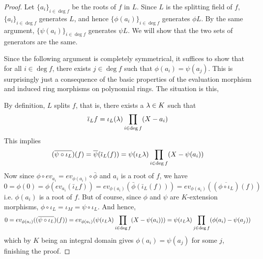 \documentclass[../book.tex]{subfiles}
\begin{document}
\begin{proof}
    Let $\{a_i\}_{i\in\deg f}$ be the roots of $f$ in $L$. 
    Since $L$ is the splitting field of $f$, $\{a_i\}_{i\in\deg f}$ generates $L$,
    and hence $\{\phi(a_i)\}_{i\in\deg f}$ generates $\phi L$. 
    By the same argument, $\{\psi(a_i)\}_{i\in\deg f}$ generates $\psi L$. 
    We will show that the two sets of generators are the same.
    
    Since the following argument is completely symmetrical, it suffices to show
    that for all $i \in \deg f$, there exists $j \in \deg f$ such that
    $\phi(a_i) = \psi(a_j)$.
    This is surprisingly just a consequence
    of the basic properties of the evaluation morphism and 
    induced ring morphisms on polynomial rings.
    The situation is this, 
    \begin{figure}[H]
        \centering
    \end{figure}
    By definition, $L$ splits $f$, that is, there exists a $\lambda \in K$ such that 
    \[\overline{\iota}_L f = \iota_L(\lambda) \prod_{i\in\deg f}(X - a_i)\]
    This implies \[
        (\overline{\psi \circ \iota_L})(f) 
        = \overline{\psi}(\overline{\iota}_L(f))
        = \psi(\iota_L \lambda) \prod_{i\in\deg f} (X-\psi(a_i))
    \]
    Now since $\phi \circ ev_{a_i} = ev_{\phi(a_i)} \circ \bar\phi$
    and $a_i$ is a root of $f$, we have \[
        0 = \phi(0) = \phi (ev_{a_i} (\bar\iota_L f)) 
        = ev_{\phi(a_i)} (\bar\phi(\bar\iota_L (f)))
        = ev_{\phi(a_i)}((\overline{\phi \circ \iota_L}) (f))
    \]
    i.e. $\phi(a_i)$ is a root of $f$. 
    But of course, since $\phi$ and $\psi$ are $K$-extension morphisms,
    $\phi \circ \iota_L = \iota_M = \psi \circ \iota_L$.
    And hence, \[
        0 = ev_{\phi(a_i)}( (\overline{\psi \circ \iota_L})(f) )
        = ev_{\phi(a_i)} (\psi(\iota_L \lambda) \prod_{i\in\deg f} (X-\psi(a_i)))
        = \psi(\iota_L \lambda) \prod_{j\in\deg f} (\phi(a_i) -\psi(a_j))
    \]
    which by $K$ being an integral domain gives $\phi(a_i) = \psi(a_j)$
    for some $j$, finishing the proof. 
\end{proof}
\end{document}
